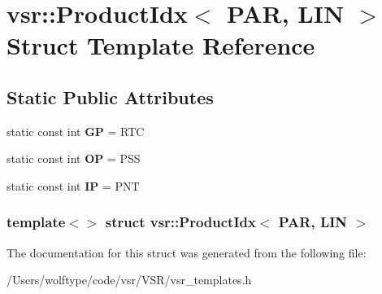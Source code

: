 \hypertarget{structvsr_1_1_product_idx_3_01_p_a_r_00_01_l_i_n_01_4}{\section{vsr\-:\-:Product\-Idx$<$ P\-A\-R, L\-I\-N $>$ Struct Template Reference}
\label{structvsr_1_1_product_idx_3_01_p_a_r_00_01_l_i_n_01_4}
}
\subsection*{Static Public Attributes}
\begin{DoxyCompactItemize}
\item 
\hypertarget{structvsr_1_1_product_idx_3_01_p_a_r_00_01_l_i_n_01_4_a584292991884e2ade8ce3462c92fbc00}{static const int {\bfseries G\-P} = R\-T\-C}\label{structvsr_1_1_product_idx_3_01_p_a_r_00_01_l_i_n_01_4_a584292991884e2ade8ce3462c92fbc00}

\item 
\hypertarget{structvsr_1_1_product_idx_3_01_p_a_r_00_01_l_i_n_01_4_a8a66d9bf7f8b56bbba5e0a814c8b3429}{static const int {\bfseries O\-P} = P\-S\-S}\label{structvsr_1_1_product_idx_3_01_p_a_r_00_01_l_i_n_01_4_a8a66d9bf7f8b56bbba5e0a814c8b3429}

\item 
\hypertarget{structvsr_1_1_product_idx_3_01_p_a_r_00_01_l_i_n_01_4_adfe0c6617580ce59994a1909c9b6297e}{static const int {\bfseries I\-P} = P\-N\-T}\label{structvsr_1_1_product_idx_3_01_p_a_r_00_01_l_i_n_01_4_adfe0c6617580ce59994a1909c9b6297e}

\end{DoxyCompactItemize}
\subsubsection*{template$<$$>$ struct vsr\-::\-Product\-Idx$<$ P\-A\-R, L\-I\-N $>$}



The documentation for this struct was generated from the following file\-:\begin{DoxyCompactItemize}
\item 
/\-Users/wolftype/code/vsr/\-V\-S\-R/vsr\-\_\-templates.\-h\end{DoxyCompactItemize}
